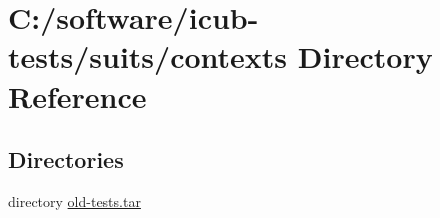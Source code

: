 \section{C\+:/software/icub-\/tests/suits/contexts Directory Reference}
\label{dir_f69af4b29e11ba6afb4a6fff3d9a4b7c}
\subsection*{Directories}
\begin{DoxyCompactItemize}
\item 
directory \hyperlink{dir_a4e0617811b392d609ad3da5d5d1af03}{old-\/tests.\+tar}
\end{DoxyCompactItemize}
